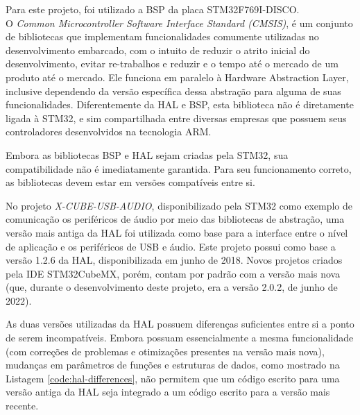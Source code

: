 Para este projeto, foi utilizado a BSP da placa STM32F769I-DISCO.
\\[10pt]

O \textit{Common Microcontroller Software Interface Standard (CMSIS)}, é um conjunto de bibliotecas que implementam funcionalidades comumente utilizadas no desenvolvimento embarcado, com o intuito de reduzir o atrito inicial do desenvolvimento, evitar re-trabalhos e reduzir e o tempo até o mercado de um produto até o mercado. Ele funciona em paralelo à Hardware Abstraction Layer, inclusive dependendo da versão específica dessa abstração para alguma de suas funcionalidades. Diferentemente da HAL e BSP, esta biblioteca não é diretamente ligada à STM32, e sim compartilhada entre diversas empresas que possuem seus controladores desenvolvidos na tecnologia ARM.


Embora as bibliotecas BSP e HAL sejam criadas pela STM32, sua compatibilidade não é imediatamente garantida. Para seu funcionamento correto, as bibliotecas devem estar em versões compatíveis entre si.

No projeto \textit{X-CUBE-USB-AUDIO}, disponibilizado pela STM32 como exemplo de comunicação os periféricos de áudio por meio das bibliotecas de abstração, uma versão mais antiga da HAL foi utilizada como base para a interface entre o nível de aplicação e os periféricos de USB e áudio. Este projeto possui como base a versão 1.2.6 da HAL, disponibilizada em junho de 2018. Novos projetos criados pela IDE STM32CubeMX, porém, contam por padrão com a versão mais nova (que, durante o desenvolvimento deste projeto, era a versão 2.0.2, de junho de 2022).

As duas versões utilizadas da HAL possuem diferenças suficientes entre si a ponto de serem incompatíveis. Embora possuam essencialmente a mesma funcionalidade (com correções de problemas e otimizações presentes na versão mais nova), mudanças em parâmetros de funções e estruturas de dados, como mostrado na Listagem \ref{code:hal-differences}, não permitem que um código escrito para uma versão antiga da HAL seja integrado a um código escrito para a versão mais recente.

